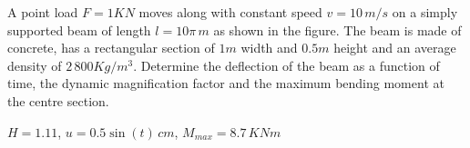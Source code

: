 
\begin{Exercise}[label={moving_load}]
A point load $F=1KN$ moves along with constant speed $v=10\,m/s$ on a simply supported beam of length $l=10\pi\,m$ as shown in the figure. The beam is made of concrete, has a rectangular section of $1m$ width and $0.5m$ height and an average density of $2\,800Kg/m^3$. Determine the deflection of the beam as a function of time, the dynamic magnification factor and the maximum bending moment at the centre section.

\begin{center}
\end{center}

\shortAnswer $H=1.11$, $u=0.5\sin(t)\,cm$, $M_{max} = 8.7\,KNm$
\end{Exercise}



